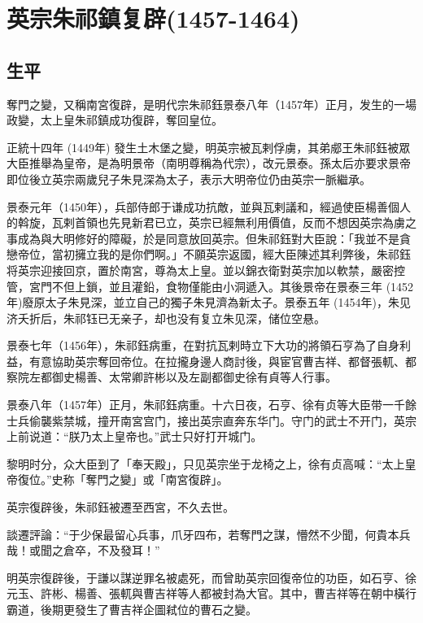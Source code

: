 
\section{英宗朱祁鎮复辟\tiny(1457-1464)}

\subsection{生平}

奪門之變，又稱南宮復辟，是明代宗朱祁鈺景泰八年（1457年）正月，发生的一場政變，太上皇朱祁鎮成功復辟，奪回皇位。

正統十四年 (1449年) 發生土木堡之變，明英宗被瓦剌俘虜，其弟郕王朱祁鈺被眾大臣推舉為皇帝，是為明景帝（南明尊稱為代宗），改元景泰。孫太后亦要求景帝即位後立英宗兩歲兒子朱見深為太子，表示大明帝位仍由英宗一脈繼承。

景泰元年（1450年），兵部侍郎于谦成功抗敵，並與瓦剌議和，經過使臣楊善個人的斡旋，瓦剌首領也先見新君已立，英宗已經無利用價值，反而不想因英宗為虜之事成為與大明修好的障礙，於是同意放回英宗。但朱祁鈺對大臣說：「我並不是貪戀帝位，當初擁立我的是你們啊。」不願英宗返國，經大臣陳述其利弊後，朱祁鈺将英宗迎接回京，置於南宮，尊為太上皇。並以錦衣衛對英宗加以軟禁，嚴密控管，宮門不但上鎖，並且灌鉛，食物僅能由小洞遞入。其後景帝在景泰三年 (1452年)廢原太子朱見深，並立自己的獨子朱見濟為新太子。景泰五年 (1454年)，朱见济夭折后，朱祁钰已无亲子，却也没有复立朱见深，储位空悬。

景泰七年（1456年），朱祁鈺病重，在對抗瓦剌時立下大功的將領石亨為了自身利益，有意協助英宗奪回帝位。在拉攏身邊人商討後，與宦官曹吉祥、都督張軏、都察院左都御史楊善、太常卿許彬以及左副都御史徐有貞等人行事。

景泰八年（1457年）正月，朱祁鈺病重。十六日夜，石亨、徐有贞等大臣带一千餘士兵偷襲紫禁城，撞开南宮宫门，接出英宗直奔东华门。守门的武士不开门，英宗上前说道：“朕乃太上皇帝也。”武士只好打开城门。

黎明时分，众大臣到了「奉天殿」，只见英宗坐于龙椅之上，徐有贞高喊：“太上皇帝復位。”史称「奪門之變」或「南宮復辟」。

英宗復辟後，朱祁鈺被遷至西宮，不久去世。

談遷評論：“于少保最留心兵事，爪牙四布，若奪門之謀，懵然不少聞，何貴本兵哉！或聞之倉卒，不及發耳！”

明英宗復辟後，于謙以謀逆罪名被處死，而曾助英宗回復帝位的功臣，如石亨、徐元玉、許彬、楊善、張軏與曹吉祥等人都被封為大官。其中，曹吉祥等在朝中橫行霸道，後期更發生了曹吉祥企圖弒位的曹石之變。

